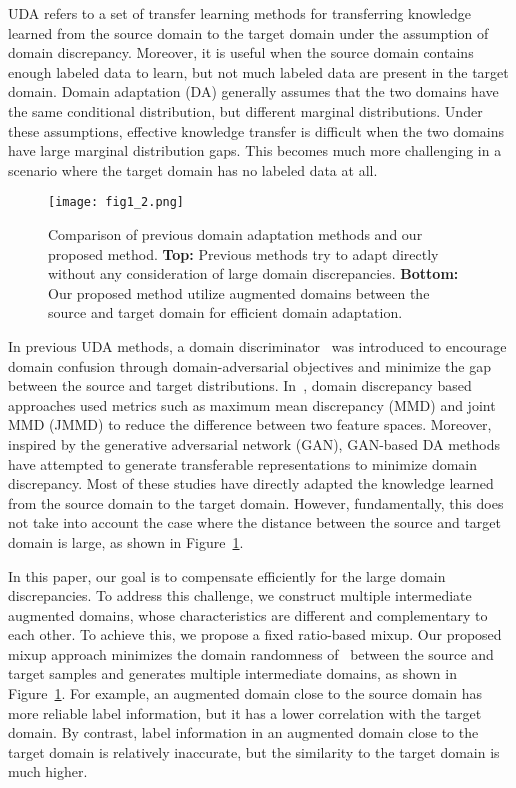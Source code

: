 \documentclass[final]{cvpr}
\begin{document}
UDA refers to a set of transfer learning methods for transferring knowledge learned from the source domain to the target domain under the assumption of domain discrepancy. Moreover, it is useful when the source domain contains enough labeled data to learn, but not much labeled data are present in the target domain. Domain adaptation (DA) generally assumes that the two domains have the same conditional distribution, but different marginal distributions. Under these assumptions, effective knowledge transfer is difficult when the two domains have large marginal distribution gaps. This becomes much more challenging in a scenario where the target domain has no labeled data at all.


\begin{figure}[t]
\centering
\texttt{[image: fig1\_2.png]}
\caption{Comparison of previous domain adaptation methods and our proposed method. \textbf{Top:} Previous methods try to adapt directly without any consideration of large domain discrepancies. \textbf{Bottom:} 
Our proposed method utilize augmented domains between the source and target domain for efficient domain adaptation.
}
\label{fig:01}
\end{figure}

In previous UDA methods, a domain discriminator~\cite{Ganin2015, ADDA2017} was introduced to encourage domain confusion through domain-adversarial objectives and minimize the gap between the source and target distributions. In~\cite{Long2015, Long2017}, domain discrepancy based approaches used metrics such as maximum mean discrepancy (MMD) and joint MMD (JMMD) to reduce the difference between two feature spaces. Moreover, inspired by the generative adversarial network (GAN), GAN-based DA methods~\cite{CyCADA2017, Shuhao2020} have attempted to generate transferable representations to minimize domain discrepancy. Most of these studies have directly adapted the knowledge learned from the source domain to the target domain. However, fundamentally, this does not take into account the case where the distance between the source and target domain is large, as shown in Figure~\ref{fig:01}.

In this paper, our goal is to compensate efficiently for the large domain discrepancies. To address this challenge, we construct multiple intermediate augmented domains, whose characteristics are different and complementary to each other. To achieve this, we propose a fixed ratio-based mixup. Our proposed mixup approach minimizes the domain randomness of~\cite{Wu2020, Minghao2020} between the source and target samples and generates multiple intermediate domains, as shown in Figure~\ref{fig:01}. For example, an augmented domain close to the source domain has more reliable label information, but it has a lower correlation with the target domain. By contrast, label information in an augmented domain close to the target domain is relatively inaccurate, but the similarity to the target domain is much higher. 
\end{document}

